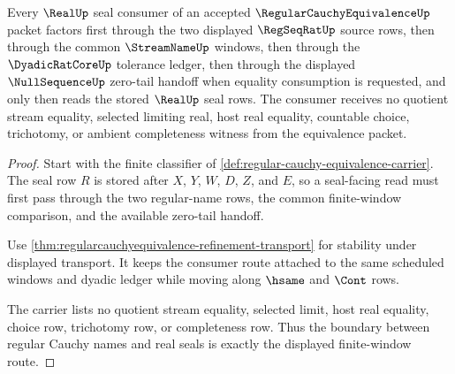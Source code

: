 \begin{theorem}
\label{thm:regular-cauchy-equivalence-real-classifier-boundary}
Every $\RealUp$ seal consumer of an accepted $\RegularCauchyEquivalenceUp$ packet factors first through the two displayed $\RegSeqRatUp$ source rows, then through the common $\StreamNameUp$ windows, then through the $\DyadicRatCoreUp$ tolerance ledger, then through the displayed $\NullSequenceUp$ zero-tail handoff when equality consumption is requested, and only then reads the stored $\RealUp$ seal rows. The consumer receives no quotient stream equality, selected limiting real, host real equality, countable choice, trichotomy, or ambient completeness witness from the equivalence packet.
\end{theorem}
\begin{proof}
Start with the finite classifier of \autoref{def:regular-cauchy-equivalence-carrier}. The seal row $R$ is stored after $X$, $Y$, $W$, $D$, $Z$, and $E$, so a seal-facing read must first pass through the two regular-name rows, the common finite-window comparison, and the available zero-tail handoff.

Use \autoref{thm:regularcauchyequivalence-refinement-transport} for stability under displayed transport. It keeps the consumer route attached to the same scheduled windows and dyadic ledger while moving along $\hsame$ and $\Cont$ rows.

The carrier lists no quotient stream equality, selected limit, host real equality, choice row, trichotomy row, or completeness row. Thus the boundary between regular Cauchy names and real seals is exactly the displayed finite-window route.
\end{proof}

